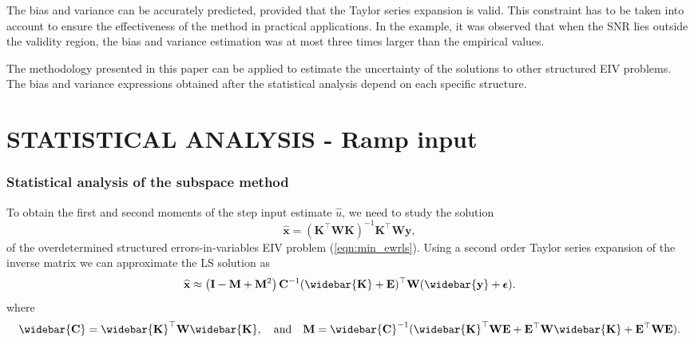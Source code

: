 The bias and variance can be accurately predicted, provided that the Taylor series expansion is valid.
This constraint has to be taken into account to ensure the effectiveness of the method in practical applications.
In the example, it was observed that when the SNR lies outside the validity region, the bias and variance estimation was at most three times larger than the empirical values.

The methodology presented in this paper can be applied to estimate the uncertainty of the solutions to other structured EIV problems.
The bias and variance expressions obtained after the statistical analysis depend on each specific structure.




\section{STATISTICAL ANALYSIS - Ramp input}


\subsubsection{Statistical analysis of the subspace method}

To obtain the first and second moments of the step input estimate $\widehat{u}$, we need to study the solution
\begin{equation} \widehat{\mathbf{x}} = ( \mathbf{K}^\top \mathbf{W} \mathbf{K}  )^{-1} \mathbf{K}^\top \mathbf{W} \mathbf{y} , \label{eqn:xhat} \end{equation}
of the overdetermined structured errors-in-variables EIV problem (\ref{eqn:min_ewrls}).
Using a second order Taylor series expansion of the inverse matrix we can approximate the LS solution as
\begin{equation} \widehat{\mathbf{x}} \approx \left( \mathbf{I} - \mathbf{M} + \mathbf{M}^2 \right) \mathbf{C}^{-1} (\widebar{\mathbf{K}} + \mathbf{E})^\top \mathbf{W} (\widebar{\mathbf{y}} + \bm{\epsilon}). \label{eqn:xhatexp} \end{equation} 
where 
\begin{equation} \widebar{\mathbf{C}} = \widebar{\mathbf{K}}^\top \mathbf{W} \widebar{\mathbf{K}}, \quad \text{and} \quad \mathbf{M} = \widebar{\mathbf{C}}^{-1} ( \widebar{\mathbf{K}}^\top \mathbf{W} \mathbf{E} + \mathbf{E}^\top \mathbf{W} \widebar{\mathbf{K}} + \mathbf{E}^\top \mathbf{W} \mathbf{E} ). \end{equation} 


